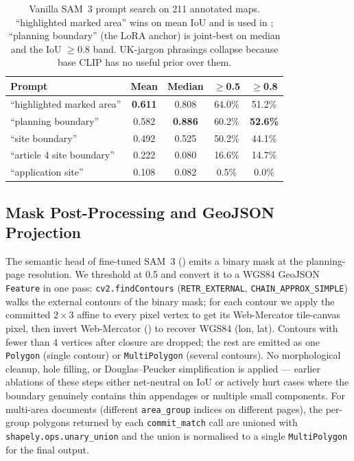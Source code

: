\documentclass[11pt]{article}
\begin{document}
\begin{table}[h]
\centering
\setlength{\tabcolsep}{1.5pt}
\small
\begin{tabular}{@{}lcccc@{}}
\toprule
\textbf{Prompt} & \textbf{Mean} & \textbf{Median} & \textbf{$\geq$0.5} & \textbf{$\geq$0.8} \\ \midrule
``highlighted marked area''  & \textbf{0.611} & 0.808 & 64.0\% & 51.2\% \\
``planning boundary''        & 0.582 & \textbf{0.886} & 60.2\% & \textbf{52.6\%} \\
``site boundary''            & 0.492 & 0.525 & 50.2\% & 44.1\% \\
``article 4 site boundary''  & 0.222 & 0.080 & 16.6\% & 14.7\% \\
``application site''         & 0.108 & 0.082 &  0.5\% &  0.0\% \\ \bottomrule
\end{tabular}
\caption{Vanilla SAM~3 prompt search on 211 annotated maps. ``highlighted marked area'' wins on mean IoU and is used in ; ``planning boundary'' (the LoRA anchor) is joint-best on median and the IoU $\geq 0.8$ band. UK-jargon phrasings collapse because base CLIP has no useful prior over them.}
\label{tab:abl-sam-prompt-search}
\end{table}

\subsection{Mask Post-Processing and GeoJSON Projection}
\label{subsection:mask-postproc}

The semantic head of fine-tuned SAM~3 () emits a binary mask at the planning-page resolution. We threshold at 0.5 and convert it to a WGS84 GeoJSON \texttt{Feature} in one pass: \texttt{cv2.findContours} (\texttt{RETR\_EXTERNAL}, \texttt{CHAIN\_APPROX\_SIMPLE}) walks the external contours of the binary mask; for each contour we apply the committed $2\times3$ affine to every pixel vertex to get its Web-Mercator tile-canvas pixel, then invert Web-Mercator () to recover WGS84 (lon, lat). Contours with fewer than 4 vertices after closure are dropped; the rest are emitted as one \texttt{Polygon} (single contour) or \texttt{MultiPolygon} (several contours). No morphological cleanup, hole filling, or Douglas--Peucker simplification is applied --- earlier ablations of these steps either net-neutral on IoU or actively hurt cases where the boundary genuinely contains thin appendages or multiple small components. For multi-area documents (different \texttt{area\_group} indices on different pages), the per-group polygons returned by each \texttt{commit\_match} call are unioned with \texttt{shapely.ops.unary\_union} and the union is normalised to a single \texttt{MultiPolygon} for the final output.
\end{document}
